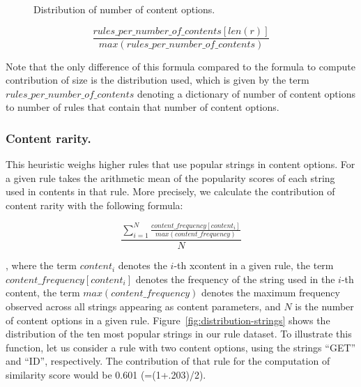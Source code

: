 \documentclass[sigconf,review, anonymous]{acmart}
\begin{document}
\begin{figure}[t!]
  \centering
  \caption{\label{fig:distribution-contents}Distribution of number of
    content options.}
\end{figure}  

\[\frac{\mathit{rules\_per\_number\_of\_contents[len(r)]}}{\mathit{max(rules\_per\_number\_of\_contents)}}\]

\noindent
Note that the only difference of this formula compared to the formula
to compute contribution of size is the distribution used, which is
given by the term $\mathit{rules\_per\_number\_of\_contents}$ denoting
a dictionary of number of content options to number of rules that
contain that number of content options.

\subsubsection{Content rarity.} 
This heuristic weighs higher rules that use popular strings in content
options. For a given rule \tname{} takes the arithmetic mean of the
popularity scores of each string used in contents in that rule. More
precisely, we calculate the contribution of content rarity with the
following formula:

\[\frac{\sum_{i=1}^{N}\frac{\mathit{content\_frequency[content_i]}}{\mathit{max(content\_frequency)}}}{N}\]

\noindent
, where the term $\mathit{content_i}$ denotes the $i$-th xcontent in a
given rule, the term $\mathit{content\_frequency[\mathit{content_i}]}$
denotes the frequency of the string used in the $i$-th content, the
term $\mathit{max(content\_frequency)}$ denotes the maximum frequency
observed across all strings appearing as content parameters, and $N$
is the number of content options in a given
rule. Figure~\ref{fig:distribution-strings} shows the distribution of
the ten most popular strings in our rule dataset. To illustrate this
function, let us consider a rule with two content options, using the
strings ``GET'' and ``ID'', respectively. The contribution of that
rule for the computation of similarity score would be 0.601
(=(1+.203)/2).
\end{document}
